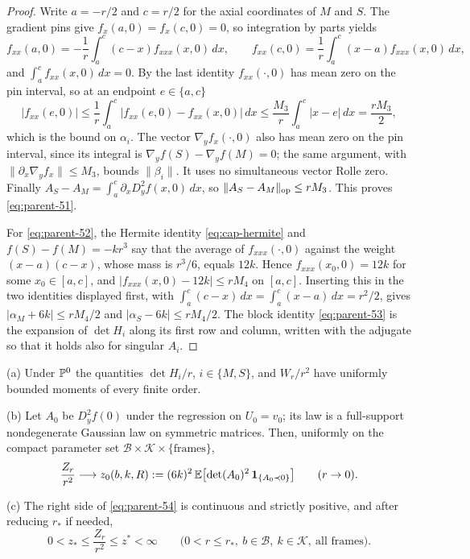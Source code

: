 \begin{proof}
Write $a=-r/2$ and $c=r/2$ for the axial coordinates of $M$ and $S$. The gradient pins give $f_x(a,0)=f_x(c,0)=0$, so integration by parts yields
\[
f_{xx}(a,0)=-\frac1r\int_a^c(c-x)f_{xxx}(x,0)\,dx,\qquad f_{xx}(c,0)=\frac1r\int_a^c(x-a)f_{xxx}(x,0)\,dx,
\]
and $\int_a^cf_{xx}(x,0)\,dx=0$. By the last identity $f_{xx}(\cdot,0)$ has mean zero on the pin interval, so at an endpoint $e\in\{a,c\}$
\[
|f_{xx}(e,0)|\le\frac1r\int_a^c|f_{xx}(e,0)-f_{xx}(x,0)|\,dx\le\frac{M_3}r\int_a^c|x-e|\,dx=\frac{rM_3}2 ,
\]
which is the bound on $\alpha_i$. The vector $\nabla_yf_x(\cdot,0)$ also has mean zero on the pin interval, since its integral is $\nabla_yf(S)-\nabla_yf(M)=0$; the same argument, with $\|\partial_x\nabla_yf_x\|\le M_3$, bounds $\|\beta_i\|$. It uses no simultaneous vector Rolle zero. Finally $A_S-A_M=\int_a^c\partial_xD_y^2f(x,0)\,dx$, so $\|A_S-A_M\|_{\rm op}\le rM_3$. This proves \eqref{eq:parent-51}.

For \eqref{eq:parent-52}, the Hermite identity \eqref{eq:cap-hermite} and $f(S)-f(M)=-kr^3$ say that the average of $f_{xxx}(\cdot,0)$ against the weight $(x-a)(c-x)$, whose mass is $r^3/6$, equals $12k$. Hence $f_{xxx}(x_0,0)=12k$ for some $x_0\in[a,c]$, and $|f_{xxx}(x,0)-12k|\le rM_4$ on $[a,c]$. Inserting this in the two identities displayed first, with $\int_a^c(c-x)\,dx=\int_a^c(x-a)\,dx=r^2/2$, gives $|\alpha_M+6k|\le rM_4/2$ and $|\alpha_S-6k|\le rM_4/2$. The block identity \eqref{eq:parent-53} is the expansion of $\det H_i$ along its first row and column, written with the adjugate so that it holds also for singular $A_i$.
\end{proof}

\begin{proposition}\label{prop:parent-normalizer}
\textup{(a)} Under $\mathbb P^0$ the quantities $\det H_i/r$, $i\in\{M,S\}$, and $W_r/r^2$ have uniformly bounded moments of every finite order.

\textup{(b)} Let $A_0$ be $D_y^2f(0)$ under the regression on $U_0=v_0$; its law is a full-support nondegenerate Gaussian law on symmetric matrices. Then, uniformly on the compact parameter set $\mathcal B\times\mathcal K\times\{\text{frames}\}$,
\begin{equation}\label{eq:parent-54}
\frac{Z_r}{r^2}\longrightarrow z_0(b,k,R):=(6k)^2\,\mathbb E\bigl[\det(A_0)^2\,\mathbf 1_{\{A_0\prec0\}}\bigr]\qquad(r\to0).
\end{equation}

\textup{(c)} The right side of \eqref{eq:parent-54} is continuous and strictly positive, and after reducing $r_*$ if needed,
\begin{equation}\label{eq:parent-55}
0<z_*\le\frac{Z_r}{r^2}\le z^*<\infty\qquad\bigl(0<r\le r_*,\ b\in\mathcal B,\ k\in\mathcal K,\ \text{all frames}\bigr).
\end{equation}
\end{proposition}


